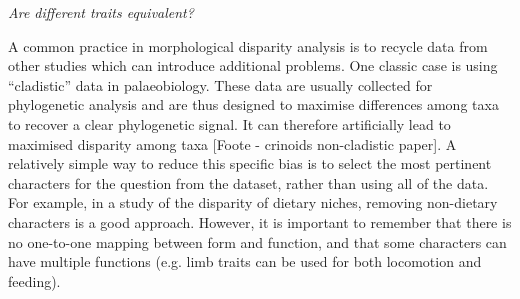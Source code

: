 \documentclass[12pt,letterpaper]{article}
\renewcommand{\subsection}[1]{%
\bigskip
\begin{center}
\begin{large}
\normalfont\itshape #1
\end{large}
\end{center}}
\begin{document}
\subsection{Are different traits equivalent?}
A common practice in morphological disparity analysis is to recycle data from other studies which can introduce additional problems.
One classic case is using ``cladistic'' data in palaeobiology.
These data are usually collected for phylogenetic analysis and are thus designed to maximise differences among taxa to recover a clear phylogenetic signal.
It can therefore artificially lead to maximised disparity among taxa [Foote - crinoids non-cladistic paper].
A relatively simple way to reduce this specific bias is to select the most pertinent characters for the question from the dataset, rather than using all of the data.
For example, in a study of the disparity of dietary niches, removing non-dietary characters is a good approach.
However, it is important to remember that there is no one-to-one mapping between form and function, and that some characters can have multiple functions (e.g. limb traits can be used for both locomotion and feeding).
\end{document}

